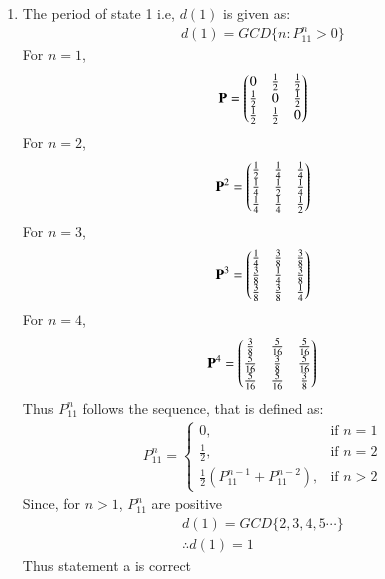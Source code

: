 \documentclass[journal,12pt,twocolumn]{IEEEtran}
\begin{document}
    \begin{enumerate}
    \item{ The period of state 1 i.e, $d(1)$ is given as:
    \begin{align}
    d(1)=GCD\{n : P_{11}^n > 0\} \label{eq1a}
    \end{align}
     For $n=1$,
    \begin{align}
    \mathbf{P}=\begin{pmatrix}0&\frac{1}{2}&\frac{1}{2}\\\frac{1}{2}&0&\frac{1}{2}\\\frac{1}{2}&\frac{1}{2}&0\end{pmatrix}\\
    \end{align}
    For $n=2$,
    \begin{align}
    \mathbf{P}^2=\begin{pmatrix}\frac{1}{2}&\frac{1}{4}&\frac{1}{4}\\\frac{1}{4}&\frac{1}{2}&\frac{1}{4}\\\frac{1}{4}&\frac{1}{4}&\frac{1}{2}\end{pmatrix}\\
    \end{align}
    For $n=3$,
    \begin{align}
    \mathbf{P}^3=\begin{pmatrix}\frac{1}{4}&\frac{3}{8}&\frac{3}{8}\\\frac{3}{8}&\frac{1}{4}&\frac{3}{8}\\\frac{3}{8}&\frac{3}{8}&\frac{1}{4}\end{pmatrix}\\
    \end{align}
        For $n=4$,
    \begin{align}
    \mathbf{P}^4=\begin{pmatrix}\frac{3}{8}&\frac{5}{16}&\frac{5}{16}\\\frac{5}{16}&\frac{3}{8}&\frac{5}{16}\\\frac{5}{16}&\frac{5}{16}&\frac{3}{8}\end{pmatrix}\\
    \end{align}
Thus $P_{11}^n$ follows the sequence, that is defined as:
\begin{align}
    P_{11}^n= 
\begin{cases}
	0,& \text{if } n=1\\
    \frac{1}{2},& \text{if } n=2\\
    \frac{1}{2}(P_{11}^{n-1}+P_{11}^{n-2}),& \text{if } n >2
\end{cases}
\end{align}
    Since, for $n>1$, $P_{11}^n$ are positive 
    \begin{align}
    d(1)=GCD\{2,3,4,5\cdots\}\\
    \therefore d(1)=1 \label{eq1}
    \end{align}
    Thus statement a is correct}\\

\end{enumerate}
\end{document}
